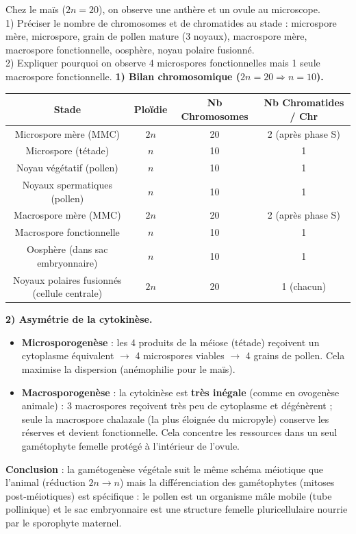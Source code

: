 \documentclass[11pt]{article}
\begin{document}
\begin{exoresolu}
Chez le maïs ($2n = 20$), on observe une anthère et un ovule au microscope.\\
1) Préciser le nombre de chromosomes et de chromatides au stade : microspore mère, microspore, grain de pollen mature (3 noyaux), macrospore mère, macrospore fonctionnelle, oosphère, noyau polaire fusionné.\\
2) Expliquer pourquoi on observe 4 microspores fonctionnelles mais 1 seule macrospore fonctionnelle.
\tcblower
\textbf{1) Bilan chromosomique ($2n=20 \Rightarrow n=10$).}
\begin{center}
\begin{tabular}{|c|c|c|c|}\hline
\rowcolor{popblueL}
\textbf{Stade} & \textbf{Ploïdie} & \textbf{Nb Chromosomes} & \textbf{Nb Chromatides / Chr} \\ \hline
Microspore mère (MMC) & $2n$ & 20 & 2 (après phase S) \\ \hline
Microspore (tétade) & $n$ & 10 & 1 \\ \hline
Noyau végétatif (pollen) & $n$ & 10 & 1 \\ \hline
Noyaux spermatiques (pollen) & $n$ & 10 & 1 \\ \hline
Macrospore mère (MMC) & $2n$ & 20 & 2 (après phase S) \\ \hline
Macrospore fonctionnelle & $n$ & 10 & 1 \\ \hline
Oosphère (dans sac embryonnaire) & $n$ & 10 & 1 \\ \hline
Noyaux polaires fusionnés (cellule centrale) & $2n$ & 20 & 1 (chacun) \\ \hline
\end{tabular}
\end{center}
\textbf{2) Asymétrie de la cytokinèse.}\\
\begin{itemize}
\item \textbf{Microsporogenèse} : les 4 produits de la méiose (tétade) reçoivent un cytoplasme équivalent $\to$ 4 microspores viables $\to$ 4 grains de pollen. Cela maximise la dispersion (anémophilie pour le maïs).
\item \textbf{Macrosporogenèse} : la cytokinèse est \textbf{très inégale} (comme en ovogenèse animale) : 3 macrospores reçoivent très peu de cytoplasme et dégénèrent ; seule la macrospore chalazale (la plus éloignée du micropyle) conserve les réserves et devient fonctionnelle. Cela concentre les ressources dans un seul gamétophyte femelle protégé à l'intérieur de l'ovule.
\end{itemize}
\textbf{Conclusion} : la gamétogenèse végétale suit le même schéma méiotique que l'animal (réduction $2n \to n$) mais la différenciation des gamétophytes (mitoses post-méiotiques) est spécifique : le pollen est un organisme mâle mobile (tube pollinique) et le sac embryonnaire est une structure femelle pluricellulaire nourrie par le sporophyte maternel.
\end{exoresolu}
\end{document}
